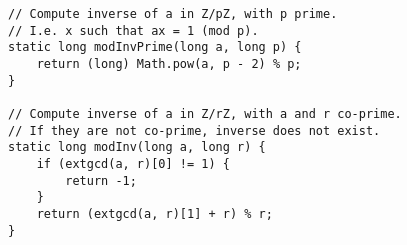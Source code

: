\begin{verbatim}
// Compute inverse of a in Z/pZ, with p prime.
// I.e. x such that ax = 1 (mod p).
static long modInvPrime(long a, long p) {
	return (long) Math.pow(a, p - 2) % p;
}

// Compute inverse of a in Z/rZ, with a and r co-prime.
// If they are not co-prime, inverse does not exist.
static long modInv(long a, long r) {
	if (extgcd(a, r)[0] != 1) {
		return -1;
	}
	return (extgcd(a, r)[1] + r) % r;
}
\end{verbatim}
